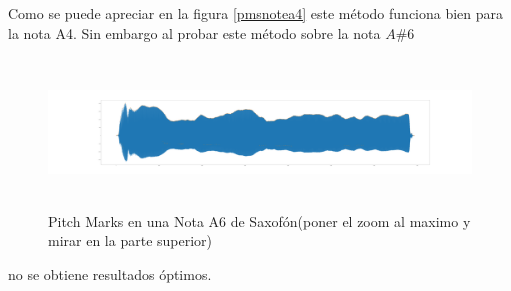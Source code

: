 Como se puede apreciar en la figura \ref{pmsnotea4} este método funciona bien para la nota A4. Sin embargo al probar este método sobre la nota $A\#6$

\begin{figure}[H]
	\centering
	\includegraphics[width=\linewidth,height=150px]{ImagenesEjercicio5/Asharp6.png}
	\caption{Pitch Marks en una Nota A6 de Saxofón(poner el zoom  al maximo y mirar en la parte superior)}
	\label{fig:pmsnotea4}
\end{figure}
no se obtiene resultados óptimos.






 











